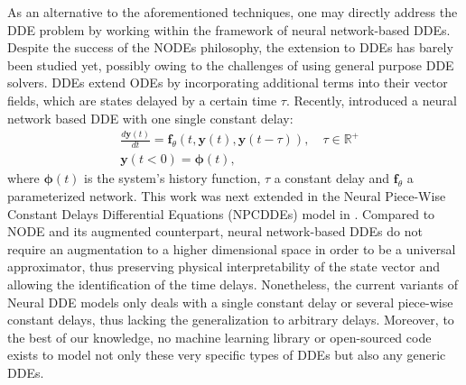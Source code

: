 \documentclass[pmlr]{jmlr}%
\begin{document}
As an alternative to the aforementioned techniques, one may directly address the DDE problem by working within the framework of neural network-based DDEs. Despite the success of the NODEs philosophy, the extension to DDEs has barely been studied yet, possibly owing to the challenges of using general purpose DDE solvers. DDEs extend ODEs by incorporating additional terms into their vector fields, which are states delayed by a certain time $\tau$. Recently, \cite{first_neural_dde} introduced a neural network based DDE with one single constant delay:
%
\begin{equation}
\begin{aligned}
& \frac{d \mathbf{y}(t)}{dt} = \mathbf{f}_{\theta}(t, \mathbf{y}(t), \mathbf{y}(t-\tau)), \quad \tau \in \mathbb{R}^{+} \\
& \mathbf{y}(t<0) = \boldsymbol{\phi}(t),
\end{aligned}
\label{eqn:first_neural_dde}
\end{equation}
%
where $\boldsymbol{\phi}(t)$ is the system's history function, $\tau$ a constant delay and $ \mathbf{f}_{\theta}$ a parameterized network. This work was next extended in the Neural Piece-Wise Constant Delays Differential Equations (NPCDDEs) model in \cite{neural_piece_wise_dde}. Compared to NODE and its augmented counterpart, neural network-based DDEs do not require an augmentation to a higher dimensional space in order to be a universal approximator, thus preserving physical interpretability of the state vector and allowing the identification of the time delays. Nonetheless, the current variants of Neural DDE models only deals with a single constant delay or several piece-wise constant delays, thus lacking the generalization to arbitrary delays. Moreover, to the best of our knowledge, no machine learning library or open-sourced code exists to model not only these very specific types of DDEs but also any generic DDEs. 
\\
\end{document}
